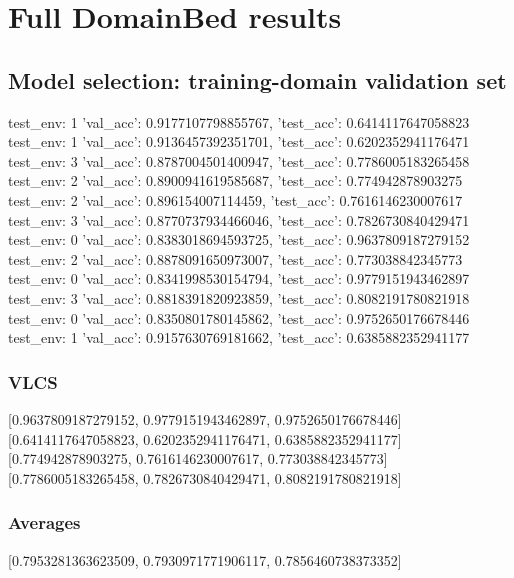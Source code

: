 \documentclass{article}
\begin{document}
\section{Full DomainBed results}

\subsection{Model selection: training-domain validation set}
test_env: 1
{'val_acc': 0.9177107798855767, 'test_acc': 0.6414117647058823}
test_env: 1
{'val_acc': 0.9136457392351701, 'test_acc': 0.6202352941176471}
test_env: 3
{'val_acc': 0.8787004501400947, 'test_acc': 0.7786005183265458}
test_env: 2
{'val_acc': 0.8900941619585687, 'test_acc': 0.774942878903275}
test_env: 2
{'val_acc': 0.896154007114459, 'test_acc': 0.7616146230007617}
test_env: 3
{'val_acc': 0.8770737934466046, 'test_acc': 0.7826730840429471}
test_env: 0
{'val_acc': 0.8383018694593725, 'test_acc': 0.9637809187279152}
test_env: 2
{'val_acc': 0.8878091650973007, 'test_acc': 0.773038842345773}
test_env: 0
{'val_acc': 0.8341998530154794, 'test_acc': 0.9779151943462897}
test_env: 3
{'val_acc': 0.8818391820923859, 'test_acc': 0.8082191780821918}
test_env: 0
{'val_acc': 0.8350801780145862, 'test_acc': 0.9752650176678446}
test_env: 1
{'val_acc': 0.9157630769181662, 'test_acc': 0.6385882352941177}

\subsubsection{VLCS}
[0.9637809187279152, 0.9779151943462897, 0.9752650176678446]
[0.6414117647058823, 0.6202352941176471, 0.6385882352941177]
[0.774942878903275, 0.7616146230007617, 0.773038842345773]
[0.7786005183265458, 0.7826730840429471, 0.8082191780821918]

\begin{center}
\end{center}

\subsubsection{Averages}
[0.7953281363623509, 0.7930971771906117, 0.7856460738373352]

\begin{center}
\end{center}
\end{document}
